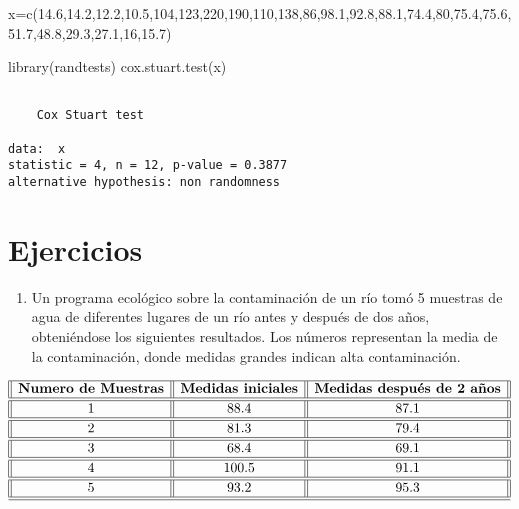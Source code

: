 \documentclass[
  a4paper,
  oneside,
  openany]{book}
\newenvironment{Shaded}{\begin{snugshade}}{\end{snugshade}}
\newcommand{\DecValTok}[1]{\textcolor[rgb]{0.00,0.00,0.81}{#1}}
\newcommand{\FloatTok}[1]{\textcolor[rgb]{0.00,0.00,0.81}{#1}}
\newcommand{\FunctionTok}[1]{\textcolor[rgb]{0.00,0.00,0.00}{#1}}
\newcommand{\NormalTok}[1]{#1}
\newcommand{\OtherTok}[1]{\textcolor[rgb]{0.56,0.35,0.01}{#1}}
\providecommand{\tightlist}{%
  \setlength{\itemsep}{0pt}\setlength{\parskip}{0pt}}
\begin{document}
\begin{Shaded}
\begin{Highlighting}[]
\NormalTok{x}\OtherTok{=}\FunctionTok{c}\NormalTok{(}\FloatTok{14.6}\NormalTok{,}\FloatTok{14.2}\NormalTok{,}\FloatTok{12.2}\NormalTok{,}\FloatTok{10.5}\NormalTok{,}\DecValTok{104}\NormalTok{,}\DecValTok{123}\NormalTok{,}\DecValTok{220}\NormalTok{,}\DecValTok{190}\NormalTok{,}\DecValTok{110}\NormalTok{,}\DecValTok{138}\NormalTok{,}\DecValTok{86}\NormalTok{,}\FloatTok{98.1}\NormalTok{,}\FloatTok{92.8}\NormalTok{,}\FloatTok{88.1}\NormalTok{,}\FloatTok{74.4}\NormalTok{,}\DecValTok{80}\NormalTok{,}\FloatTok{75.4}\NormalTok{,}\FloatTok{75.6}\NormalTok{,}\FloatTok{51.7}\NormalTok{,}\FloatTok{48.8}\NormalTok{,}\FloatTok{29.3}\NormalTok{,}\FloatTok{27.1}\NormalTok{,}\DecValTok{16}\NormalTok{,}\FloatTok{15.7}\NormalTok{)}


\FunctionTok{library}\NormalTok{(randtests)}
\FunctionTok{cox.stuart.test}\NormalTok{(x)}
\end{Highlighting}
\end{Shaded}

\begin{verbatim}

    Cox Stuart test

data:  x
statistic = 4, n = 12, p-value = 0.3877
alternative hypothesis: non randomness
\end{verbatim}

\hypertarget{ejercicios-4}{%
\section{Ejercicios}\label{ejercicios-4}}

\begin{enumerate}
\def\labelenumi{\arabic{enumi}.}
\tightlist
\item
  Un programa ecológico sobre la contaminación de un río tomó 5 muestras de agua de diferentes lugares de un río antes y después de dos años, obteniéndose los siguientes resultados. Los números representan la media de la contaminación, donde medidas grandes indican alta contaminación.
\end{enumerate}

\[
\begin{array}{||c| |c| |c||} 
\hline 
\textbf{Numero de Muestras} & \textbf{Medidas iniciales} & \textbf{Medidas después de 2 años}  \\  
\hline
\hline
1 &88.4& 87.1 \\
\hline
\hline
2& 81.3 &79.4 \\
\hline
\hline
3 &68.4 & 69.1 \\
\hline
\hline
4 &100.5& 91.1 \\
\hline
\hline
5 & 93.2&95.3 \\
\hline
\hline
\end{array}
\]
\end{document}
